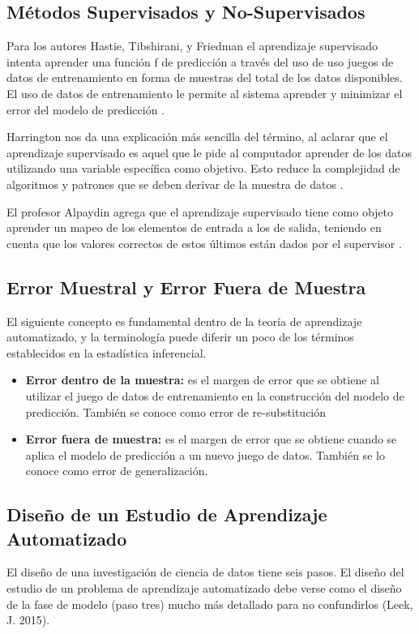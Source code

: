 \documentclass[letterpaper, spanish, 11pt]{report}
\begin{document}
\subsection{Métodos Supervisados y No-Supervisados}
Para los autores Hastie, Tibshirani, y Friedman el aprendizaje supervisado intenta aprender una función f de predicción a través del uso de uso juegos de datos de entrenamiento en forma de muestras del total de los datos disponibles. El uso de datos de entrenamiento le permite al sistema aprender y minimizar el error del modelo de predicción \cite{theElements}.  

Harrington nos da una explicación más sencilla del término, al aclarar que el aprendizaje supervisado es aquel que le pide al computador aprender de los datos utilizando una variable específica como objetivo. Esto reduce la complejidad de algoritmos y patrones que se deben derivar de la muestra de datos \cite{harrington}. 

El profesor Alpaydin agrega que el aprendizaje supervisado tiene como objeto aprender un mapeo de los elementos de entrada a los de salida, teniendo en cuenta que los valores correctos de estos últimos están dados por el supervisor \cite{alpaydin}.

\subsection{Error Muestral y Error Fuera de Muestra}
El siguiente concepto es fundamental dentro de la teoría de aprendizaje automatizado, y la terminología puede diferir un poco de los términos establecidos en la estadística inferencial.

	\begin{itemize}
		\item \textbf{Error dentro de la muestra:} es el margen de error que se obtiene al utilizar el juego de datos de entrenamiento en la construcción del modelo de predicción. También se conoce como error de re-substitución 
		\item  \textbf{Error fuera de muestra:} es el margen de error que se obtiene cuando se aplica el modelo de predicción a un nuevo juego de datos. También se lo conoce como error de generalización. 
	\end{itemize}

\subsection{Diseño de un Estudio de Aprendizaje Automatizado}
El diseño de una investigación de ciencia de datos tiene seis pasos. El diseño del estudio de un problema de aprendizaje automatizado debe verse como el diseño de la fase de modelo (paso tres) mucho más detallado para no confundirlos (Leek, J. 2015).
\end{document}
